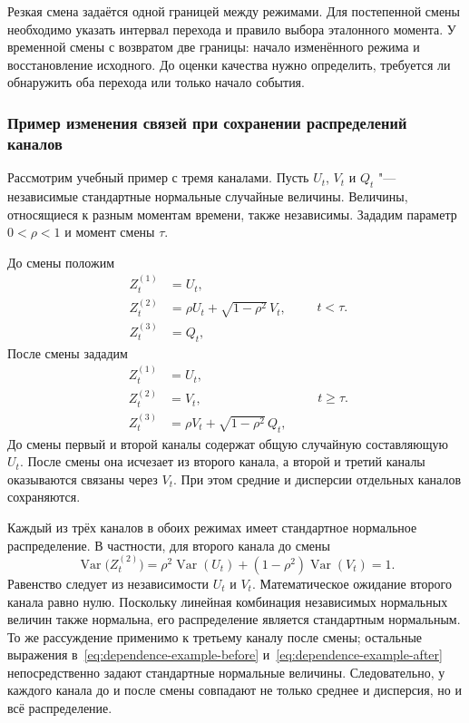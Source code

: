 \documentclass[bachelor, och, diploma]{SCWorks}
\begin{document}
Резкая смена задаётся одной границей между режимами. Для постепенной смены необходимо указать интервал перехода и правило выбора эталонного момента. У временной смены с возвратом две границы: начало изменённого режима и восстановление исходного. До оценки качества нужно определить, требуется ли обнаружить оба перехода или только начало события.

\subsubsection{Пример изменения связей при сохранении распределений каналов}

Рассмотрим учебный пример с тремя каналами. Пусть $U_t$, $V_t$ и $Q_t$ "--- независимые стандартные нормальные случайные величины. Величины, относящиеся к разным моментам времени, также независимы. Зададим параметр $0<\rho<1$ и момент смены $\tau$.

До смены положим
\begin{equation}
    \begin{aligned}
        Z_t^{(1)} &= U_t,\\
        Z_t^{(2)} &= \rho U_t + \sqrt{1-\rho^2}\,V_t,\\
        Z_t^{(3)} &= Q_t,
    \end{aligned}
    \qquad t<\tau.
    \label{eq:dependence-example-before}
\end{equation}
После смены зададим
\begin{equation}
    \begin{aligned}
        Z_t^{(1)} &= U_t,\\
        Z_t^{(2)} &= V_t,\\
        Z_t^{(3)} &= \rho V_t + \sqrt{1-\rho^2}\,Q_t,
    \end{aligned}
    \qquad t\geq\tau.
    \label{eq:dependence-example-after}
\end{equation}
До смены первый и второй каналы содержат общую случайную составляющую $U_t$. После смены она исчезает из второго канала, а второй и третий каналы оказываются связаны через $V_t$. При этом средние и дисперсии отдельных каналов сохраняются.

Каждый из трёх каналов в обоих режимах имеет стандартное нормальное распределение. В частности, для второго канала до смены
\begin{equation}
    \operatorname{Var}\bigl(Z_t^{(2)}\bigr)
    =\rho^2\operatorname{Var}(U_t)
    +(1-\rho^2)\operatorname{Var}(V_t)=1.
    \label{eq:dependence-example-variance}
\end{equation}
Равенство следует из независимости $U_t$ и $V_t$. Математическое ожидание второго канала равно нулю. Поскольку линейная комбинация независимых нормальных величин также нормальна, его распределение является стандартным нормальным. То же рассуждение применимо к третьему каналу после смены; остальные выражения в~\eqref{eq:dependence-example-before} и~\eqref{eq:dependence-example-after} непосредственно задают стандартные нормальные величины. Следовательно, у каждого канала до и после смены совпадают не только среднее и дисперсия, но и всё распределение.
\end{document}
